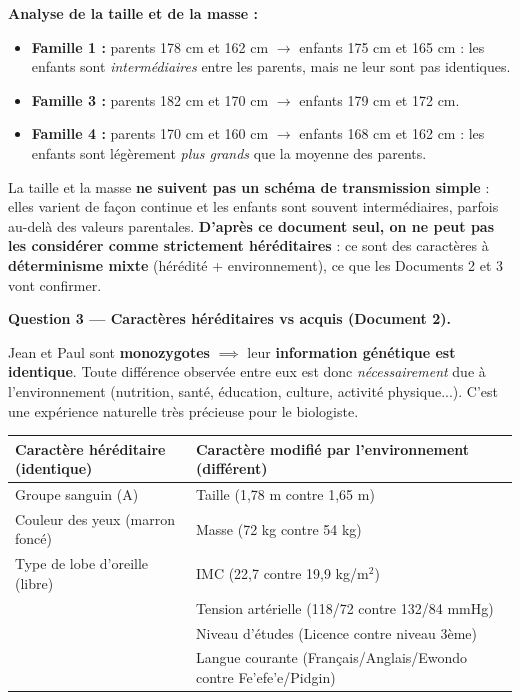 \documentclass[11pt]{article}
\begin{document}
\begin{exoresolu}
\par
\textbf{Analyse de la taille et de la masse :}
\begin{itemize}
    \item \textbf{Famille 1 :} parents 178 cm et 162 cm $\to$ enfants 175 cm et 165 cm : les enfants sont \emph{intermédiaires} entre les parents, mais ne leur sont pas identiques.
    \item \textbf{Famille 3 :} parents 182 cm et 170 cm $\to$ enfants 179 cm et 172 cm.
    \item \textbf{Famille 4 :} parents 170 cm et 160 cm $\to$ enfants 168 cm et 162 cm : les enfants sont légèrement \emph{plus grands} que la moyenne des parents.
\end{itemize}
La taille et la masse \textbf{ne suivent pas un schéma de transmission simple} : elles varient de façon continue et les enfants sont souvent intermédiaires, parfois au-delà des valeurs parentales. \textbf{D'après ce document seul, on ne peut pas les considérer comme strictement héréditaires} : ce sont des caractères à \textbf{déterminisme mixte} (hérédité + environnement), ce que les Documents 2 et 3 vont confirmer.

\medskip
\textbf{Question 3 — Caractères héréditaires vs acquis (Document 2).}
\par
Jean et Paul sont \textbf{monozygotes} $\implies$ leur \textbf{information génétique est identique}. Toute différence observée entre eux est donc \emph{nécessairement} due à l'environnement (nutrition, santé, éducation, culture, activité physique...). C'est une \og expérience naturelle \fg{} très précieuse pour le biologiste.

\begin{center}
\begin{tabularx}{\linewidth}{|>{\centering\arraybackslash}X|>{\centering\arraybackslash}X|}\hline
\rowcolor{popblueL}
\textbf{Caractère héréditaire (identique)} & \textbf{Caractère modifié par l'environnement (différent)} \\ \hline
Groupe sanguin (A) & Taille (1,78 m contre 1,65 m) \\ \hline
Couleur des yeux (marron foncé) & Masse (72 kg contre 54 kg) \\ \hline
Type de lobe d'oreille (libre) & IMC (22,7 contre 19,9 kg/m$^2$) \\ \hline
& Tension artérielle (118/72 contre 132/84 mmHg) \\ \hline
& Niveau d'études (Licence contre niveau 3ème) \\ \hline
& Langue courante (Français/Anglais/Ewondo contre Fe'efe'e/Pidgin) \\ \hline
\end{tabularx}
\end{center}


\end{exoresolu}
\end{document}
